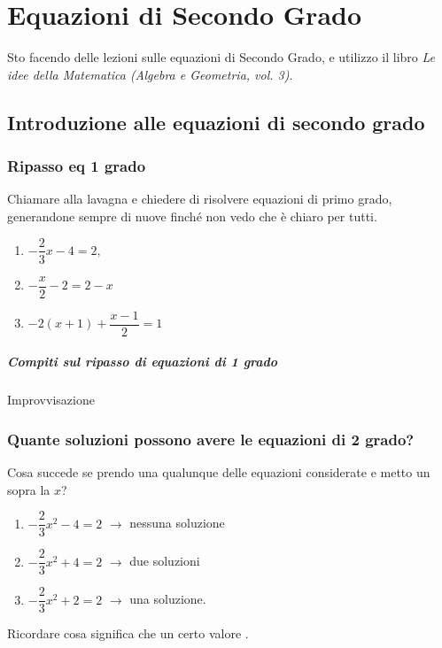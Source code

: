 \documentclass[11pt]{report}
\begin{document}
\tableofcontents

\chapter{Equazioni di Secondo Grado}
Sto facendo delle lezioni sulle equazioni di Secondo Grado, e utilizzo il libro \textit{Le idee della Matematica (Algebra e Geometria, vol. 3)}. 

\section{Introduzione alle equazioni di secondo grado}

\subsection{Ripasso eq 1 grado}
Chiamare alla lavagna e chiedere di risolvere equazioni di primo grado, generandone sempre di nuove finché non vedo che è chiaro per tutti.
\begin{enumerate}
    \item $-\dfrac 23 x -4 = 2,$
    \item $-\dfrac x2 -2 =2-x$
    \item $-2(x+1)+\dfrac{x-1}2= 1$
\end{enumerate}


\paragraph{Compiti sul ripasso di equazioni di 1 grado}
Improvvisazione

\subsection{Quante soluzioni possono avere le equazioni di 2 grado?}

Cosa succede se prendo una qualunque delle equazioni considerate e metto un  sopra la $x$?
\begin{enumerate}
    \item $-\dfrac 23 x^2 -4 = 2$ $\rightarrow$ nessuna soluzione
    \item $-\dfrac 23 x^2 + 4 = 2$ $\rightarrow$ due soluzioni
    \item $-\dfrac 23 x^2+2=2$ $\rightarrow$ una soluzione.  
\end{enumerate}


Ricordare cosa significa che un certo valore .
\end{document}
